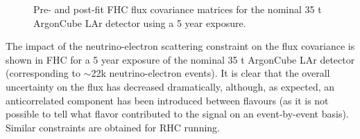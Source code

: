 \begin{figure}[htbp]
  \centering
  \caption{Pre- and post-fit FHC flux covariance matrices for the nominal 35 t ArgonCube LAr detector using a 5 year exposure.}
  \label{fig:LAR_nominal_covariances}
\end{figure}
The impact of the neutrino-electron scattering constraint on the flux covariance is shown in FHC for a 5 year exposure of the nominal 35 t ArgonCube LAr detector (corresponding to $\sim$22k neutrino-electron events). It is clear that the overall uncertainty on the flux has decreased dramatically, although, as expected, an anticorrelated component has been introduced between flavours (as it is not possible to tell what flavor contributed to the signal on an event-by-event basis). Similar constraints are obtained for RHC running.

